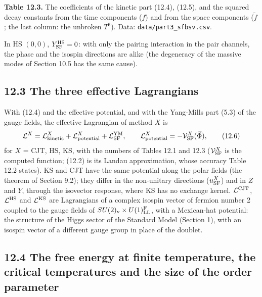 \documentclass[
  10pt,
]{article}
\begin{document}
\textbf{Table 12.3.} The coefficients of the kinetic part (12.4),
(12.5), and the squared decay constants from the time components (\(f\))
and from the space components (\(\tilde f\); the last column: the
unbroken \(T^3\)). Data: \texttt{data/part3\_sfbsv.csv}.

In HS \((0,0)\), \(Y^{\rm HS}_{\rm SF}=0\): with only the pairing
interaction in the pair channels, the phase and the isospin directions
are alike (the degeneracy of the massive modes of Section 10.5 has the
same cause).

\hypertarget{the-three-effective-lagrangians}{%
\subsection{12.3 The three effective
Lagrangians}\label{the-three-effective-lagrangians}}

With (12.4) and the effective potential, and with the Yang-Mills part
(5.3) of the gauge fields, the effective Lagrangian of method \(X\) is
\[\mathcal L^X=\mathcal L^X_{\rm kinetic}+\mathcal L^X_{\rm potential}+\mathcal L^{\rm YM}_{\rm SF},\qquad\mathcal L^X_{\rm potential}=-\mathcal V^X_{\rm SF}(\vec\Phi),\tag{12.6}\]
for \(X\) = CJT, HS, KS, with the numbers of Tables 12.1 and 12.3
(\(\mathcal V^X_{\rm SF}\) is the computed function; (12.2) is its
Landau approximation, whose accuracy Table 12.2 states). KS and CJT have
the same potential along the polar fields (the theorem of Section 9.2);
they differ in the non-unitary directions (\(u^X_{\rm SF}\)) and in
\(Z\) and \(Y\), through the isovector response, where KS has no
exchange kernel. \(\mathcal L^{\rm CJT}\), \(\mathcal L^{\rm HS}\) and
\(\mathcal L^{\rm KS}\) are Lagrangians of a complex isospin vector of
fermion number 2 coupled to the gauge fields of
\(SU(2)_{\rm v}\times U(1)^{\rm F}_{\rm LL}\), with a Mexican-hat
potential: the structure of the Higgs sector of the Standard Model
(Section 1), with an isospin vector of a different gauge group in place
of the doublet.

\hypertarget{the-free-energy-at-finite-temperature-the-critical-temperatures-and-the-size-of-the-order-parameter}{%
\subsection{12.4 The free energy at finite temperature, the critical
temperatures and the size of the order
parameter}\label{the-free-energy-at-finite-temperature-the-critical-temperatures-and-the-size-of-the-order-parameter}}
\end{document}
